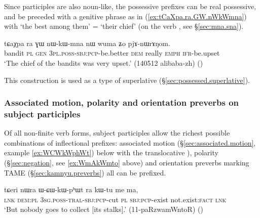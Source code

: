 Since participles are also noun-like, the possessive prefixes can be real possessive, and be preceded with a genitive phrase as in (\ref{ex:tCaXpa.ra.GW.nWkWmna}) with  `the best among them' = `their chief' (on the verb , see §\ref{sec:mna.sna}).

 \begin{exe} 
\ex \label{ex:tCaXpa.ra.GW.nWkWmna}
\gll tɕaχpa ra ɣɯ nɯ-kɯ-mna nɯ wuma ʑo pjɤ-nɯrɤŋom.\\
bandit \textsc{pl} \textsc{gen} \textsc{3pl}.\textsc{poss}-\textsc{sbj}:\textsc{pcp}-be.better \textsc{dem} really \textsc{emph} \textsc{ifr}-be.upset\\
\glt `The chief of the bandits was very upset.' (140512 alibaba-zh)
()
\end{exe}

This construction is used as a type of superlative (§\ref{sec:possessed.superlative}).

\subsubsection{Associated motion, polarity and orientation preverbs on subject participles}  \label{sec:subject.participle.other.prefixes}
Of all non-finite verb forms, subject participles allow the richest possible combinations of inflectional prefixes: associated motion (§\ref{sec:associated.motion}, example \ref{ex:WCWkWphWt}) below with the translocative ), polarity (§\ref{sec:negation}, see \ref{ex:WmAkWmto} above) and orientation preverbs marking TAME (§\ref{sec:kamnyu.preverbs}) all can be prefixed. 
 
\begin{exe}
\ex \label{ex:WCWkWphWt}
 \gll tɕeri nɯra ɯ-ɕɯ-kɯ-pʰɯt ra kɯ-tu me ma,   \\
 \textsc{lnk} \textsc{dem}:\textsc{pl} \textsc{3sg}.\textsc{poss}-\textsc{tral}-\textsc{sbj}:\textsc{pcp}-cut \textsc{pl} \textsc{sbj}:\textsc{pcp}-exist not.exist:\textsc{fact} \textsc{lnk} \\
 \glt `But nobody goes to collect [its stalks].' (11-paRzwamWntoR)
()
\end{exe}

